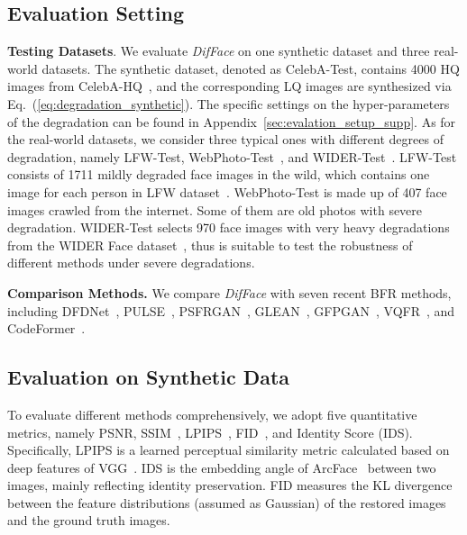 \documentclass[10pt,twocolumn,letterpaper]{article}
\begin{document}
\subsection{Evaluation Setting}
\noindent\textbf{Testing Datasets}. We evaluate \textit{DifFace} on one synthetic dataset and three real-world datasets. The synthetic dataset, denoted as CelebA-Test, contains 4000 HQ images from CelebA-HQ~\cite{karras2018progressive}, and the corresponding LQ images are synthesized via Eq.~(\ref{eq:degradation_synthetic}). The specific settings on the hyper-parameters of the degradation can be found in Appendix~\ref{sec:evalation_setup_supp}.
As for the real-world datasets, we consider three typical ones with different degrees of degradation, namely LFW-Test, WebPhoto-Test~\cite{wang2021towards}, and WIDER-Test~\cite{toward2022zhou}. LFW-Test consists of 1711 mildly degraded face images in the wild, which contains one image for each person in LFW dataset~\cite{huang2008labeled}. WebPhoto-Test is made up of 407 face images crawled from the internet. Some of them are old photos with severe degradation. WIDER-Test selects 970 face images with very heavy degradations from the WIDER Face dataset~\cite{yang2016wider}, thus is suitable to test the robustness of different methods under severe degradations.

\noindent\textbf{Comparison Methods.} We compare \textit{DifFace} with seven recent BFR methods, including DFDNet~\cite{li2020blind}, PULSE~\cite{menon2020pulse}, PSFRGAN~\cite{chen2021progressive}, GLEAN~\cite{chan2021glean}, GFPGAN~\cite{wang2021towards}, VQFR~\cite{gu2022vqfr}, and CodeFormer~\cite{toward2022zhou}.

\subsection{Evaluation on Synthetic Data}
To evaluate different methods comprehensively, we adopt five quantitative metrics, namely PSNR, SSIM~\cite{wang2004image}, LPIPS~\cite{zhang2018unreasonable}, FID~\cite{heusel2017gans}, and Identity Score (IDS). Specifically, LPIPS is a learned perceptual similarity metric calculated based on deep features of VGG~\cite{DBLP:journals/corr/SimonyanZ14a}. IDS is the embedding angle of ArcFace~\cite{deng2019arcface} between two images, mainly reflecting identity preservation. FID measures the KL divergence between the feature distributions (assumed as Gaussian) of the restored images and the ground truth images.
\end{document}
